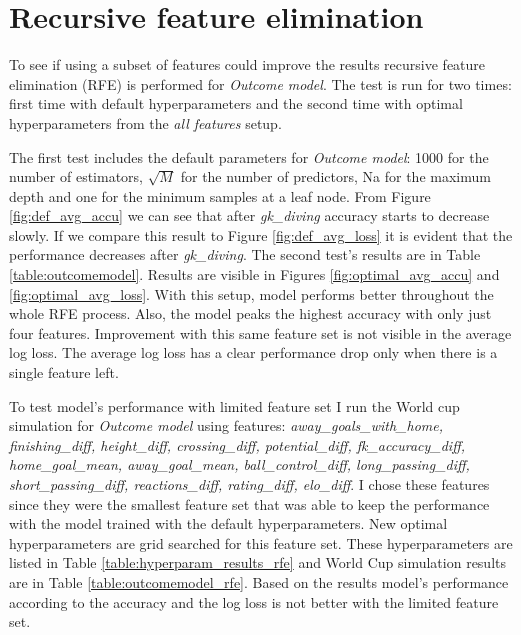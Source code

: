 \section{Recursive feature elimination}
To see if using a subset of features could improve the results recursive feature elimination (RFE) is performed for \textit{Outcome model}. The test is run for two times: first time with default hyperparameters and the second time with optimal hyperparameters from the \textit{all features} setup.

The first test includes the default parameters for \textit{Outcome model}: 1000 for the number of estimators, $\sqrt{M}$ for the number of predictors, Na for the maximum depth and one for the minimum samples at a leaf node. From Figure \ref{fig:def_avg_accu} we can see that after \textit{gk\_diving} accuracy starts to decrease slowly. If we compare this result to Figure \ref{fig:def_avg_loss} it is evident that the performance decreases after \textit{gk\_diving}. The second test's results are in Table \ref{table:outcomemodel}. Results are visible in Figures \ref{fig:optimal_avg_accu} and \ref{fig:optimal_avg_loss}. With this setup, model performs better throughout the whole RFE process. Also, the model peaks the highest accuracy with only just four features. Improvement with this same feature set is not visible in the average log loss. The average log loss has a clear performance drop only when there is a single feature left.

To test model's performance with limited feature set I run the World cup simulation for \textit{Outcome model} using features: \textit{away\_goals\_with\_home, finishing\_diff, height\_diff, crossing\_diff, potential\_diff, fk\_accuracy\_diff, home\_goal\_mean, away\_goal\_mean, ball\_control\_diff, long\_passing\_diff,  short\_passing\_diff, reactions\_diff, rating\_diff, elo\_diff}. I chose these features since they were the smallest feature set that was able to keep the performance with the model trained with the default hyperparameters. New optimal hyperparameters are grid searched for this feature set. These hyperparameters are listed in Table \ref{table:hyperparam_results_rfe} and World Cup simulation results are in Table \ref{table:outcomemodel_rfe}. Based on the results model's performance according to the accuracy and the log loss is not better with the limited feature set.

